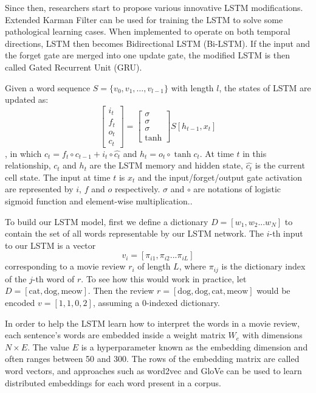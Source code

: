 \documentclass[conference]{IEEEtran}
\begin{document}
    Since then, researchers start to propose various innovative LSTM modifications.
    Extended Karman Filter can be used for training the LSTM to solve some pathological
    learning cases\cite{perez2003kalman}. When implemented to operate on both temporal
    directions, LSTM then becomes Bidirectional LSTM 
    (Bi-LSTM)\cite{schuster1997bidirectional,barnes2017assessing}.
    If the input and the forget gate are merged into one update gate, the modified LSTM
    is then called Gated Recurrent Unit (GRU)\cite{cho2014learning}.
    
    Given a word sequence $S=\{v_0,v_1,\ldots,v_{l-1}\}$ with length $l$, the states
    of LSTM are updated as:
    $$
    \begin{bmatrix} 
    i_t\\f_t\\o_t\\c_t 
    \end{bmatrix} = 
    \begin{bmatrix}
    \sigma\\\sigma\\\sigma\\\tanh
    \end{bmatrix}
    S[h_{t-1},x_t]
    $$
    , in which $c_t=f_t\circ c_{t-1} + i_t\circ\hat{c_t}$ and $h_t=o_t\circ\tanh{c_t}$.
    At time $t$ in this relationship, $c_t$ and $h_t$ are the LSTM memory and 
    hidden state, $\hat{c_t}$ is the current cell state. The input at time $t$ 
    is $x_t$ and the input/forget/output gate activation are represented by $i$, 
    $f$ and $o$ respectively. $\sigma$ and $\circ$ are notations of logistic 
    sigmoid function and element-wise multiplication.\cite{zhou2016text}.
        
    To build our LSTM model, first we define a dictionary 
    $D = [w_1, w_2...w_N]$ 
    to contain the set of all words representable by our LSTM network. The $i$-th
    input to our LSTM is a vector
    $$
    v_i = [ \pi_{i1}, \pi_{i2}... \pi_{iL}]
    $$
    corresponding to a movie review $r_i$ of length $L$, where $\pi_{ij}$ is the dictionary index of 
    the $j$-th word of $r$. To see how this would work in practice, let 
    $D = [\text{cat}, \text{dog}, \text{meow}]$. Then the review 
    $r =  [\text{dog}, \text{dog}, \text{cat}, \text{meow}]$ would be encoded 
    $v = [1, 1, 0, 2]$, assuming a 0-indexed dictionary.
    
    In order to help the LSTM learn how to interpret the words in a movie review,
    each sentence's words are embedded inside a weight matrix $W_e$ with
    dimensions $N \times E$. The value $E$ is a hyperparameter known as the 
    embedding dimension and often ranges between 50 and 300. The rows of the
    embedding matrix are called word vectors, and approaches such as word2vec 
    \cite{word2vec} and GloVe \cite{pennington2014glove} can be used to learn 
    distributed embeddings for each word present in a corpus.
    
\end{document}
